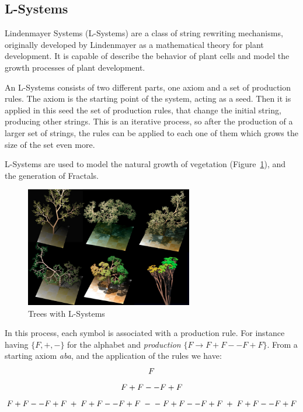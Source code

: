
\subsection{L-Systems} %
\label{sub:l_systems}

Lindenmayer Systems (L-Systems) are a class of string rewriting mechanisms, originally developed by Lindenmayer as a mathematical theory for plant
development. It is capable of describe the behavior of plant cells and model the growth processes of plant development.

An L-Systems consists of two different parts, one axiom and a set of production rules. The axiom is the starting point of the system, acting as a seed. Then it is applied in this seed the set of production rules, that change the initial string, producing other strings.
This is an iterative process, so after the production of a larger set of strings, the rules can be applied to each one of them which grows the size of
the set even more.

L-Systems are used to model the natural growth of vegetation (Figure~\ref{fig:trees}), and the generation of Fractals. 

\begin{figure}[htbp]
    \centering
    \includegraphics[width=0.65\textwidth]{images/Theory/L_Systems/Dragon_trees.jpg}
    \caption{Trees with L-Systems}
    \label{fig:trees}
\end{figure}


In this process, each symbol is associated with a production rule. For instance having $\{F, +, -\}$ for the alphabet and \emph{production} $\{F \rightarrow
 F+F--F+F\}$. From a starting axiom \emph{aba}, and the application of the rules we have:\\
\begin{equation} \label{eq:seed}
F\\
\end{equation}
\begin{equation} \label{eq:step1}
F+F--F+F\\
\end{equation}
\begin{equation} \label{eq:step2}
F+F--F+F \; + \; F+F--F+F \;- \;- \;F+F--F+F \;+ \;F+F--F+F\\
\end{equation}

